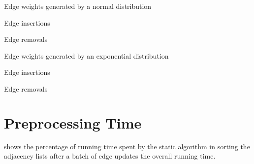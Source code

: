 \begin{table}[H]
\centering\scriptsize
\setlength{\tabcolsep}{2pt}
\label{tab:dyn-mwm:time-hyp}

\begin{subtable}[t]{\textwidth}
\centering
\caption{Edge weights generated by a normal distribution}
\begin{subtable}[t]{.5\textwidth}
\centering
Edge insertions


\end{subtable}\hfill
\begin{subtable}[t]{.5\textwidth}
\centering
Edge removals


\end{subtable}
\end{subtable}\bigskip

\begin{subtable}[t]{\textwidth}
\centering
\caption{Edge weights generated by an exponential distribution}
\begin{subtable}[t]{.5\textwidth}
\centering
Edge insertions


\end{subtable}\hfill
\begin{subtable}[t]{.5\textwidth}
\centering
Edge removals


\end{subtable}
\end{subtable}
\end{table}

\section{Preprocessing Time}
\label{apx:dyn-mwm:breakdown}

 shows the percentage of running time spent
by the static \suitor algorithm in sorting the adjacency lists after
a batch of edge updates \wrt the overall running time.

